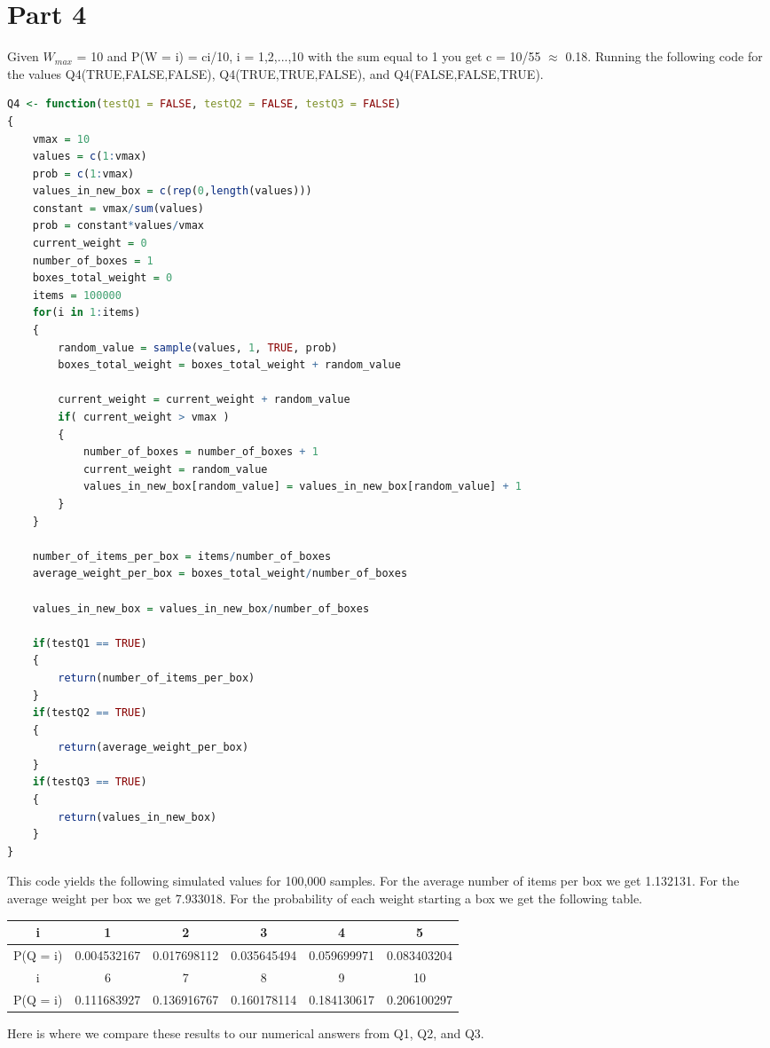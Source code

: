 \documentclass[10pt,a4paper]{article}
\begin{document}
\section{Part 4}
Given $W_{max}$ = 10 and P(W = i) = ci/10, i = 1,2,...,10 with the sum equal to 1 you get c = 10/55 $\approx$ 0.18. Running the following code for the values Q4(TRUE,FALSE,FALSE), Q4(TRUE,TRUE,FALSE), and Q4(FALSE,FALSE,TRUE).

\begin{lstlisting}[language = R]
Q4 <- function(testQ1 = FALSE, testQ2 = FALSE, testQ3 = FALSE)
{
	vmax = 10
	values = c(1:vmax)
	prob = c(1:vmax)
	values_in_new_box = c(rep(0,length(values)))
	constant = vmax/sum(values)
	prob = constant*values/vmax
	current_weight = 0
	number_of_boxes = 1
	boxes_total_weight = 0
	items = 100000
	for(i in 1:items)
	{
		random_value = sample(values, 1, TRUE, prob)
		boxes_total_weight = boxes_total_weight + random_value
		
		current_weight = current_weight + random_value
		if( current_weight > vmax )
		{
			number_of_boxes = number_of_boxes + 1
			current_weight = random_value
			values_in_new_box[random_value] = values_in_new_box[random_value] + 1
		}
	}
	
	number_of_items_per_box = items/number_of_boxes
	average_weight_per_box = boxes_total_weight/number_of_boxes
	
	values_in_new_box = values_in_new_box/number_of_boxes
	
	if(testQ1 == TRUE)
	{
		return(number_of_items_per_box)
	}
	if(testQ2 == TRUE)
	{
		return(average_weight_per_box)
	}
	if(testQ3 == TRUE)
	{
		return(values_in_new_box)
	}
}

\end{lstlisting}

This code yields the following simulated values for 100,000 samples. For the average number of items per box we get 1.132131. For the average weight per box we get 7.933018. For the probability of each weight starting a box we get the following table.
\begin{center}
\begin{tabu}{ |c|c|c|c|c|c| } 
	\hline
	i & 1 & 2 & 3 & 4 & 5 \\
	\hline
	P(Q = i) & 0.004532167 & 0.017698112 & 0.035645494 & 0.059699971 & 0.083403204   \\ 
	\hline
	i & 6 & 7 & 8 & 9 & 10\\
	\hline
	P(Q = i) & 0.111683927 & 0.136916767 & 0.160178114 & 0.184130617 & 0.206100297 \\
	\hline
\end{tabu} 
\end{center}

Here is where we compare these results to our numerical answers from Q1, Q2, and Q3.
\end{document}
